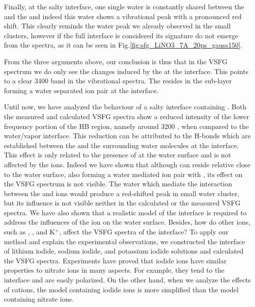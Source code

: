 Finally, at the salty interface, one single water is constantly shared between the \Li and the \nitrate and indeed 
this water shows a vibrational peak with a pronounced red shift. This clearly reminds the water peak we already observed 
in the small clusters, however if the full interface is considered its signature do not emerge from the spectra, as it can be 
seen in Fig.\thinspace\ref{fig:sfg_LiNO3_7A_20ps_gauss150}.

From the three arguments above, our conclusion is thus that in the VSFG spectrum we do only see the changes induced by the \nitrate at the interface.
This points to a clear 3400 \cm band in the vibrational spectra.
The \Li resides in the sub-layer forming a water separated ion pair at the interface.

Until now, we have analyzed the behaviour of a salty interface containing \LiN.
Both the measured and calculated VSFG spectra show a reduced intensity of the lower frequency portion of
the HB region, namely around 3200 \centimeter, when compared to the water/vapor interface. 
This reduction can be attributed to the H-bonds which are established between the \nitrate and the surrounding water molecules at the interface.
This effect is only related to the presence of \nitrate at the water surface and is not affected by the \Li ions.
Indeed we have shown that although \Li can reside relative close to the water surface, also forming a water mediated
ion pair with \nit, its effect on the VSFG spectrum is not visible. The water which mediate the interaction 
between the \nitrate and \Li ions would produce a red-shifted peak in small water cluster, but its influence is not visible 
neither in the calculated or the measured VSFG spectra. 
We have also shown that a realistic model of the interface is required to address the influences of the ion on the water surface.
Besides, how do other ions, such as \li, \na, and K$^+$, affect the VSFG spectra of the interface? 
To apply our method and explain the experimental observations, we constructed the interface of lithium iodide,
 sodium iodide, and potassium iodide solutions and calculated the VSFG spectra. 
Experiments have proved that iodide ions have similar properties to nitrate ions in many aspects. 
For example, they tend to the interface and are easily polarized. 
On the other hand, when we analyze the effects of cations, the model containing iodide ions is more simplified than the model containing nitrate ions.

